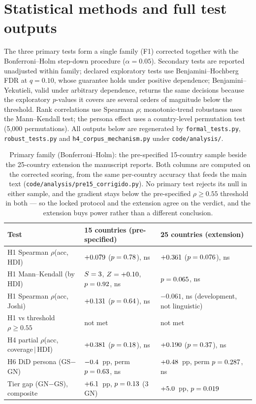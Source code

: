 \documentclass[11pt,a4paper]{article}
\begin{document}
\section{Statistical methods and full test outputs}\label{sec:s-stats}

The three primary tests form a single family (F1) corrected together
with the Bonferroni--Holm step-down procedure ($\alpha=0.05$). Secondary
tests are reported unadjusted within family; declared exploratory
tests use Benjamini--Hochberg FDR at $q=0.10$, whose guarantee holds under
positive dependence; Benjamini--Yekutieli, valid under arbitrary dependence,
returns the same decisions because the exploratory $p$-values it covers are
several orders of magnitude below the threshold. Rank correlations use Spearman
$\rho$; monotonic-trend robustness uses the Mann--Kendall test; the persona effect
uses a country-level permutation test (5{,}000 permutations). All outputs below are
regenerated by \texttt{formal\_tests.py}, \texttt{robust\_tests.py} and
\texttt{h4\_corpus\_mechanism.py} under \texttt{code/analysis/}.

\begin{table}[h]\centering
\caption{Primary family (Bonferroni--Holm): the pre-specified 15-country sample
beside the 25-country extension the manuscript reports. Both columns are computed
on the corrected scoring, from the same per-country accuracy that feeds the main
text (\texttt{code/analysis/pre15\_corrigido.py}). No primary test rejects its
null in either sample, and the gradient stays below the pre-specified
$\rho\geq 0.55$ threshold in both --- so the locked protocol and the extension
agree on the verdict, and the extension buys power rather than a different
conclusion.}
\label{tab:s-primary}
\footnotesize
\begin{tabular}{lll}
\toprule
Test & 15 countries (pre-specified) & 25 countries (extension) \\
\midrule
H1 Spearman $\rho$(acc, HDI)        & $+0.079$ ($p=0.78$), ns            & $+0.361$ ($p=0.076$), ns \\
H1 Mann--Kendall (by HDI)           & $S=3$, $Z=+0.10$, $p=0.92$, ns     & $p=0.065$, ns \\
H1 Spearman $\rho$(acc, Joshi)      & $+0.131$ ($p=0.64$), ns            & $-0.061$, ns (development, not linguistic) \\
H1 vs threshold $\rho\geq 0.55$     & not met                            & not met \\
H4 partial $\rho$(acc, coverage$\,\vert\,$HDI) & $+0.381$ ($p=0.18$), ns & $+0.190$ ($p=0.37$), ns \\
H6 DiD persona (GS$-$GN)            & $-0.4$~pp, perm $p=0.63$, ns & $+0.48$~pp, perm $p=0.287$, ns \\
Tier gap (GN$-$GS), composite       & $+6.1$~pp, $p=0.13$ (3 GN)         & $+5.0$~pp, $p=0.019$ \\
\bottomrule
\end{tabular}
\end{table}
\end{document}
